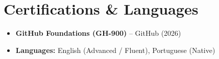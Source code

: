 \documentclass[10pt, letterpaper]{article}
\begin{document}
\section*{Certifications \& Languages}

\begin{itemize}[leftmargin=0.35cm,itemsep=1pt,parsep=0pt,topsep=2pt]
    \item \textbf{GitHub Foundations (GH-900)} -- GitHub (2026)
    \item \textbf{Languages:} English (Advanced / Fluent), Portuguese (Native)
\end{itemize}
\end{document}
